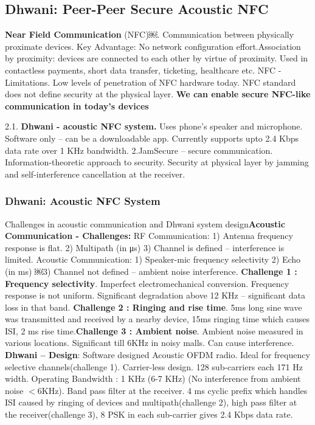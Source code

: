 \documentclass[9pt]{extarticle}
\begin{document}
\begin{multicols}{2}
\subsection{Dhwani: Peer-Peer Secure Acoustic NFC}

\textbf{Near Field Communication} (NFC)￼. Communication between physically proximate devices. Key Advantage: No network configuration effort.Association by proximity: devices are connected to each other by virtue of proximity. Used in contactless payments, short data transfer, ticketing, healthcare etc. NFC - Limitations. Low levels of penetration of NFC hardware today. NFC standard does not define security at the physical layer. \textbf{We can enable secure NFC-like communication in today's devices} 

2.1. \textbf{Dhwani - acoustic NFC system.} Uses phone’s speaker and microphone. Software only – can be a downloadable app. Currently supports upto 2.4 Kbps data rate over 1 KHz bandwidth. 2.JamSecure – secure communication. Information-theoretic approach to security. Security at physical layer by jamming and self-interference cancellation at the receiver. 

\subsubsection{Dhwani: Acoustic NFC System}

Challenges in acoustic communication and Dhwani system design\textbf{Acoustic Communication - Challenges:} RF Communication: 1) Antenna frequency response is flat. 2) Multipath (in μs) 3) Channel is defined – interference is limited. Acoustic Communication: 1) Speaker-mic frequency selectivity 2) Echo (in ms) ￼3) Channel not defined – ambient noise interference. \textbf{Challenge 1 : Frequency selectivity}. Imperfect electromechanical conversion. Frequency response is not uniform. Significant degradation above 12 KHz – significant data loss in that band. \textbf{Challenge 2 : Ringing and rise time}. 5ms long sine wave was transmitted and received by a nearby device, 15ms ringing time which causes ISI, 2 ms rise time.\textbf{Challenge 3 : Ambient noise}. Ambient noise measured in various locations. Significant till 6KHz in noisy malls. Can cause interference. \textbf{Dhwani – Design}: Software designed Acoustic OFDM radio. Ideal for frequency selective channels(challenge 1). Carrier-less design. 128 sub-carriers each 171 Hz width. Operating Bandwidth : 1 KHz (6-7 KHz) (No interference from ambient noise $<$6KHz). Band pass filter at the receiver. 4 ms cyclic prefix which handles ISI caused by ringing of devices and multipath(challenge 2), high pass filter at the receiver(challenge 3), 8 PSK in each sub-carrier gives 2.4 Kbps data rate.


\end{multicols}
\end{document}
